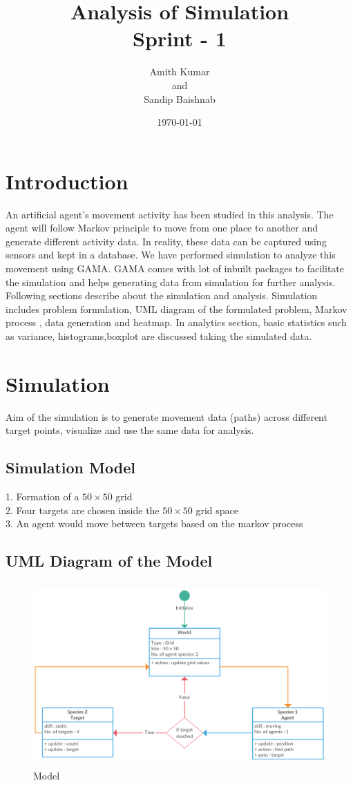 \documentclass[11pt]{report}
\title{\color{cyan} Analysis of Simulation \\ Sprint - 1}
\author{Amith Kumar\\and \\Sandip Baishnab}
\date{\today}
\begin{document}
\maketitle
\tableofcontents
\newpage
\section{\color{cyan} Introduction}
An artificial agent's movement activity has been studied in this analysis. The agent will follow Markov principle to move from one place to another and generate different activity data. In reality, these data can be captured using sensors and kept in a database. We have performed simulation to analyze this movement using GAMA. GAMA comes with lot of inbuilt packages to facilitate the simulation and helps generating data from simulation for further analysis. Following sections describe about the simulation and analysis. Simulation includes  problem formulation, UML diagram of the formulated problem, Markov process , data generation and heatmap. In analytics section, basic statistics such as  variance, histograms,boxplot are discussed taking the simulated data.      

\section{\color{cyan} Simulation }
Aim of the simulation is to generate movement data (paths) across different target points, visualize and use the same data for analysis.
\subsection{Simulation Model}
1. Formation of a $50\times 50$ grid\\
2. Four targets are chosen inside the $50\times 50$ grid space\\
3. An agent would move between targets based on the markov process\\
\subsection{UML Diagram of the Model}

\begin{figure}[h!]
  \centering
  \includegraphics[height = 7cm, width = 14cm]{Simple_Grid_Move.png}
  \caption{Model}
  \label{fig:Model}
\end{figure}
\end{document}
